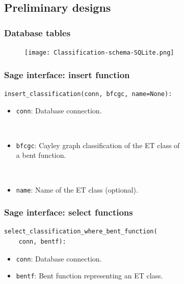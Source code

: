 \documentclass[pdf,sprung,slideColor,nocolorBG]{beamer}
\newenvironment{colortheme}[1]{
\def\ProvidesPackageRCS $##1${\relax}
\renewcommand{\ProcessOptions}{\relax}
\makeatletter

\makeatother
}{}
\begin{document}
\subsection{Preliminary designs}

\begin{colortheme}{jubata}

\begin{frame}
\frametitle{Database tables}
\begin{figure}
\centering
\begin{minipage}{\textwidth}
  \centering
\texttt{[image: Classification-schema-SQLite.png]}
  \label{fig:Classification_schema_SQLite}
\end{minipage}%
\end{figure}
\end{frame}

\begin{frame}[fragile]
\frametitle{Sage interface: insert function}

\begin{verbatim}
insert_classification(conn, bfcgc, name=None):
\end{verbatim}

\begin{itemize}
 \item \texttt{conn}: Database connection.

~

 \item \texttt{bfcgc}: Cayley graph classification of the ET class of \\a bent function.

~

 \item \texttt{name}: Name of the ET class (optional).
\end{itemize}

\end{frame}

\begin{frame}[fragile]
\frametitle{Sage interface: select functions}

\begin{verbatim}
select_classification_where_bent_function(
    conn, bentf):
\end{verbatim}
\begin{itemize}
 \item \texttt{conn}: Database connection.
 \item \texttt{bentf}: Bent function representing an ET class.
\end{itemize}


\end{frame}
\end{colortheme}
\end{document}
